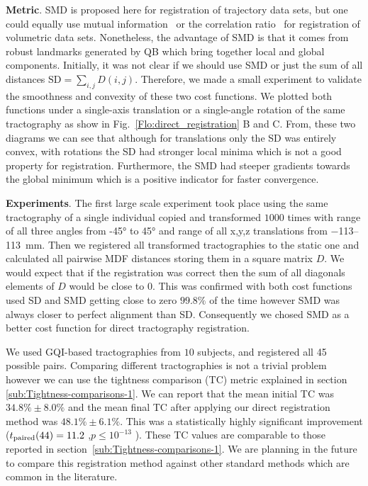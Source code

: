 \documentclass[preprint,authoryear,a4paper,10pt,onecolumn]{elsarticle}
\begin{document}
\textbf{Metric}. SMD is proposed here for registration of trajectory
data sets, but one could equally use mutual
information~\citep{maes1997multimodality} or the correlation
ratio~\citep{roche1998correlation} for registration of volumetric data
sets. Nonetheless, the advantage of SMD is that it comes from robust
landmarks generated by QB which bring together local and global
components. Initially, it was not clear if we should use SMD or just the
sum of all distances $\mathrm{SD}=\sum_{i,j}D(i,j)$.  Therefore, we made
a small experiment to validate the smoothness and convexity of these two
cost functions. We plotted both functions under a single-axis
translation or a single-angle rotation of the same tractography as show
in Fig.~\ref{Flo:direct_registration} B and C. From, these two diagrams
we can see that although for translations only the SD was entirely
convex, with rotations the SD had stronger local minima which is not a
good property for registration. Furthermore, the SMD had steeper
gradients towards the global minimum which is a positive indicator for
faster convergence.

\textbf{Experiments}. The first large scale experiment took place using
the same tractography of a single individual copied and transformed
$1000$ times with range of all three angles from \ang{-45} to \ang{45}
and range of all x,y,z translations from \numrange{-113}{113}~mm.  Then
we registered all transformed tractographies to the static one and
calculated all pairwise MDF distances storing them in a square matrix
$D$. We would expect that if the registration was correct then the sum
of all diagonals elements of $D$ would be close to $0$.  This was
confirmed with both cost functions used SD and SMD getting close to zero
$99.8\%$ of the time however SMD was always closer to perfect alignment
than SD.  Consequently we chosed SMD as a better cost function for
direct tractography registration.

We used GQI-based tractographies from $10$ subjects, and registered all
45 possible pairs. Comparing different tractographies is not a trivial
problem however we can use the tightness comparison (TC) metric
explained in section \ref{sub:Tightness-comparisons-1}.  We can report
that the mean initial TC was $34.8\%\pm8.0\%$ and the mean final TC
after applying our direct registration method was $48.1\%\pm6.1\%$. This
was a statistically highly significant improvement
($t_{\text{\textrm{paired}}}(44)=11.2$ ,$p\leq10^{-13}$ ). These TC
values are comparable to those reported in
section~\ref{sub:Tightness-comparisons-1}. We are planning in the future
to compare this registration method against other standard methods which
are common in the literature.
\end{document}
